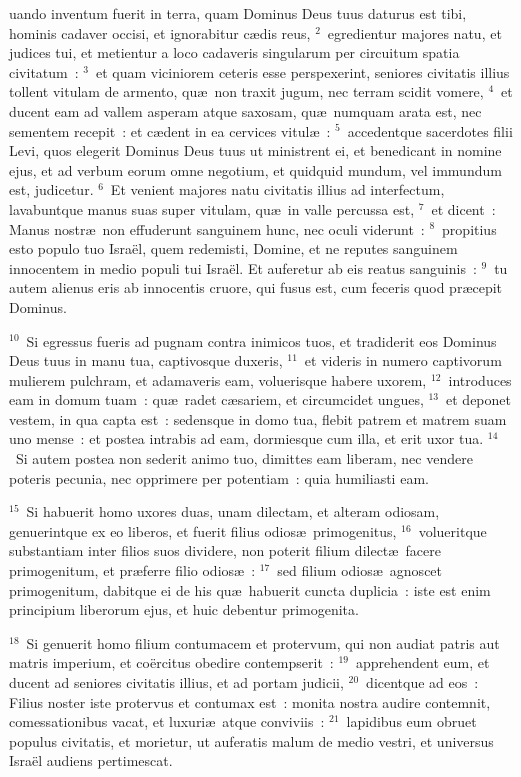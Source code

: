 \bchapter
{}uando inventum fuerit in terra, quam Dominus Deus tuus daturus est tibi, hominis cadaver occisi, et ignorabitur c\ae dis reus,
${}^{2}$~egredientur majores natu, et judices tui, et metientur a loco cadaveris singularum per circuitum spatia civitatum~:
${}^{3}$~et quam viciniorem ceteris esse perspexerint, seniores civitatis illius tollent vitulam de armento, qu\ae\ non traxit jugum, nec terram scidit vomere,
${}^{4}$~et ducent eam ad vallem asperam atque saxosam, qu\ae\ numquam arata est, nec sementem recepit~: et c\ae dent in ea cervices vitul\ae~:
${}^{5}$~accedentque sacerdotes filii Levi, quos elegerit Dominus Deus tuus ut ministrent ei, et benedicant in nomine ejus, et ad verbum eorum omne negotium, et quidquid mundum, vel immundum est, judicetur.
${}^{6}$~Et venient majores natu civitatis illius ad interfectum, lavabuntque manus suas super vitulam, qu\ae\ in valle percussa est,
${}^{7}$~et dicent~: Manus nostr\ae\ non effuderunt sanguinem hunc, nec oculi viderunt~:
${}^{8}$~propitius esto populo tuo Isra\"el, quem redemisti, Domine, et ne reputes sanguinem innocentem in medio populi tui Isra\"el. Et auferetur ab eis reatus sanguinis~:
${}^{9}$~tu autem alienus eris ab innocentis cruore, qui fusus est, cum feceris quod pr\ae cepit Dominus.


${}^{10}$~Si egressus fueris ad pugnam contra inimicos tuos, et tradiderit eos Dominus Deus tuus in manu tua, captivosque duxeris,
${}^{11}$~et videris in numero captivorum mulierem pulchram, et adamaveris eam, voluerisque habere uxorem,
${}^{12}$~introduces eam in domum tuam~: qu\ae\ radet c\ae sariem, et circumcidet ungues,
${}^{13}$~et deponet vestem, in qua capta est~: sedensque in domo tua, flebit patrem et matrem suam uno mense~: et postea intrabis ad eam, dormiesque cum illa, et erit uxor tua.
${}^{14}$~Si autem postea non sederit animo tuo, dimittes eam liberam, nec vendere poteris pecunia, nec opprimere per potentiam~: quia humiliasti eam.


${}^{15}$~Si habuerit homo uxores duas, unam dilectam, et alteram odiosam, genuerintque ex eo liberos, et fuerit filius odios\ae\ primogenitus,
${}^{16}$~volueritque substantiam inter filios suos dividere, non poterit filium dilect\ae\ facere primogenitum, et pr\ae ferre filio odios\ae~:
${}^{17}$~sed filium odios\ae\ agnoscet primogenitum, dabitque ei de his qu\ae\ habuerit cuncta duplicia~: iste est enim principium liberorum ejus, et huic debentur primogenita.


${}^{18}$~Si genuerit homo filium contumacem et protervum, qui non audiat patris aut matris imperium, et co\"ercitus obedire contempserit~:
${}^{19}$~apprehendent eum, et ducent ad seniores civitatis illius, et ad portam judicii,
${}^{20}$~dicentque ad eos~: Filius noster iste protervus et contumax est~: monita nostra audire contemnit, comessationibus vacat, et luxuri\ae\ atque conviviis~:
${}^{21}$~lapidibus eum obruet populus civitatis, et morietur, ut auferatis malum de medio vestri, et universus Isra\"el audiens pertimescat.


